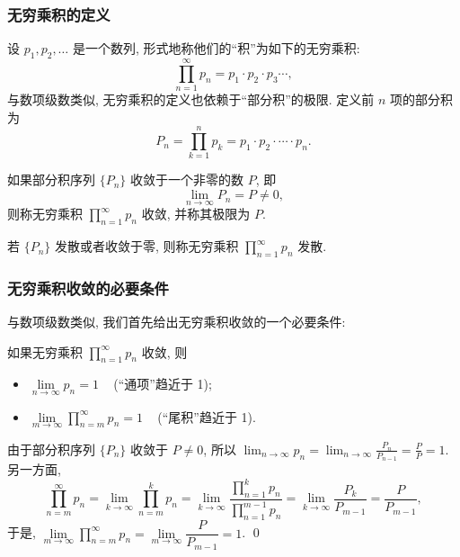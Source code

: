 
\begin{frame}
\frametitle{无穷乘积的定义}

设 $p_1, p_2, \ldots$ 是一个数列, 形式地称他们的``积''为如下的无穷乘积:
\[
\prod_{n=1}^\infty p_n = p_1 \cdot p_2 \cdot p_3 \cdots,
\]
与数项级数类似, 无穷乘积的定义也依赖于``部分积''的极限. 定义前 $n$ 项的部分积为
\[
P_n = \prod_{k=1}^n p_k = p_1 \cdot p_2 \cdot \cdots \cdot p_n.
\]

\begin{Def}[无穷乘积]
如果部分积序列 $\{P_n\}$ 收敛于一个\alert{非零}的数 $P$, 即
\[
\lim_{n \to \infty} P_n = P \neq 0,
\]
则称无穷乘积 $\prod_{n=1}^\infty p_n$ 收敛, 并称其极限为 $P$.

\pause

若 $\{P_n\}$ 发散或者收敛于零, 则称无穷乘积 $\prod_{n=1}^\infty p_n$ 发散.
\end{Def}

\end{frame}


\begin{frame}
\frametitle{无穷乘积收敛的必要条件}

与数项级数类似, 我们首先给出无穷乘积收敛的一个必要条件:
\begin{thm}
如果无穷乘积 $\prod_{n=1}^\infty p_n$ 收敛, 则
\begin{itemize}
\item $\lim\limits_{n \to \infty} p_n = 1$ ~ (``通项''趋近于 1);
\item $\lim\limits_{m \to \infty} \prod\limits_{n=m}^\infty p_n = 1$ ~ (``尾积''趋近于 1).
\end{itemize}
\end{thm}

\pause

\startproof[bg=yellow, fg=red]
由于部分积序列 $\{P_n\}$ 收敛于 $P \neq 0$, 所以 $\lim_{n \to \infty} p_n = \lim_{n \to \infty} \frac{P_n}{P_{n-1}} = \frac{P}{P} = 1$.
另一方面,
\[
\prod\limits_{n=m}^\infty p_n = \lim_{k \to \infty} \prod\limits_{n=m}^k p_n = \lim_{k \to \infty} \dfrac{\prod\limits_{n=1}^k p_n}{\prod\limits_{n=1}^{m-1} p_n} = \lim_{k \to \infty} \dfrac{P_k}{P_{m-1}} = \dfrac{P}{P_{m-1}},
\]
于是, $\lim\limits_{m \to \infty} \prod\limits_{n=m}^\infty p_n = \lim\limits_{m \to \infty} \dfrac{P}{P_{m-1}} = 1$.
\qed

\end{frame}

